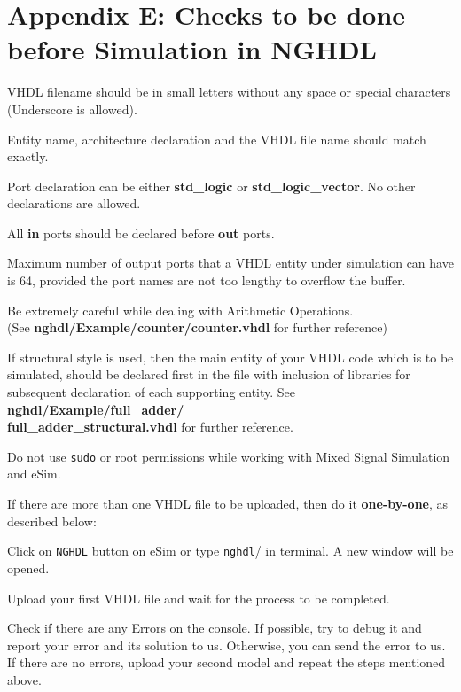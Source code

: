 \section {Appendix E: Checks to be done before Simulation in NGHDL}
\begin{compactenum}
\item VHDL filename should be in small letters without any space or special characters (Underscore is allowed).
\item Entity name, architecture declaration and the VHDL file name should match exactly.
\item Port declaration can be either \textbf{std\_logic} or \textbf{std\_logic\_vector}. No other declarations are allowed.
\item All \textbf{in} ports should be declared before \textbf{out} ports.
\item Maximum number of output ports that a VHDL entity under simulation can have is 64, provided the port names are not too lengthy to overflow the buffer.
\item Be extremely careful while dealing with Arithmetic Operations. \\ 
(See \textbf{nghdl/Example/counter/counter.vhdl} for further reference)
\item If structural style is used, then the main entity of your VHDL code which is to be simulated,  should be declared first in the file with inclusion of libraries for subsequent declaration of each supporting entity.
See \textbf{nghdl/Example/full\_adder/ \\ full\_adder\_structural.vhdl} for further reference.
\item Do not use \texttt{sudo} or root permissions while working with Mixed Signal Simulation and eSim.
\item If there are more than one VHDL file to be uploaded, then do it \textbf{one-by-one}, as described below:
    \begin{compactenum}
    \item Click on \texttt{NGHDL} button on eSim or type \texttt{nghdl}/ in terminal. A new window will be opened.
    \item Upload your first VHDL file and wait for the process to be completed.
    \item Check if there are any Errors on the console. If possible, try to debug it and report 
        your error and its solution to us. Otherwise, you can send the error to us. If there are no errors, upload your second model and repeat the steps mentioned above. \\

\end{compactenum}
\end{compactenum}
